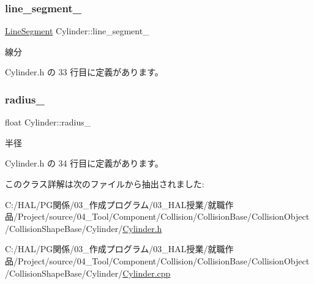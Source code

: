 \subsubsection{\texorpdfstring{line\+\_\+segment\+\_\+}{line\_segment\_}}
{\footnotesize\ttfamily \mbox{\hyperlink{class_line_segment}{Line\+Segment}} Cylinder\+::line\+\_\+segment\+\_\+\hspace{0.3cm}{\ttfamily [private]}}



線分 



 Cylinder.\+h の 33 行目に定義があります。

\mbox{\label{class_cylinder_abba752e07b11b7bfd8fcce64a6d9b678}} 
\subsubsection{\texorpdfstring{radius\+\_\+}{radius\_}}
{\footnotesize\ttfamily float Cylinder\+::radius\+\_\+\hspace{0.3cm}{\ttfamily [private]}}



半径 



 Cylinder.\+h の 34 行目に定義があります。



このクラス詳解は次のファイルから抽出されました\+:\begin{DoxyCompactItemize}
\item 
C\+:/\+H\+A\+L/\+P\+G関係/03\+\_\+作成プログラム/03\+\_\+\+H\+A\+L授業/就職作品/\+Project/source/04\+\_\+\+Tool/\+Component/\+Collision/\+Collision\+Base/\+Collision\+Object/\+Collision\+Shape\+Base/\+Cylinder/\mbox{\hyperlink{_cylinder_8h}{Cylinder.\+h}}\item 
C\+:/\+H\+A\+L/\+P\+G関係/03\+\_\+作成プログラム/03\+\_\+\+H\+A\+L授業/就職作品/\+Project/source/04\+\_\+\+Tool/\+Component/\+Collision/\+Collision\+Base/\+Collision\+Object/\+Collision\+Shape\+Base/\+Cylinder/\mbox{\hyperlink{_cylinder_8cpp}{Cylinder.\+cpp}}\end{DoxyCompactItemize}
